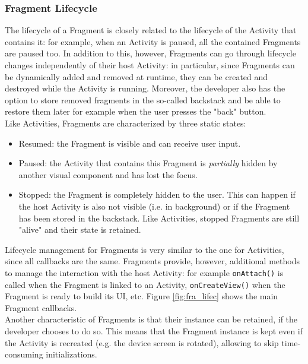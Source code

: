 \documentclass[11pt,a4paper,notitlepage]{article}
\begin{document}
\subsubsection{Fragment Lifecycle}
The lifecycle of a Fragment is closely related to the lifecycle of the Activity that contains it: for example, when an Activity is paused, all the contained Fragments are paused too. In addition to this, however, Fragments can go through lifecycle changes independently of their host Activity: in particular, since Fragments can be dynamically added and removed at runtime, they can be created and destroyed while the Activity is running. Moreover, the developer also has the option to store removed fragments in the so-called backstack and be able to restore them later for example when the user presses the "back" button.\medskip \\
Like Activities, Fragments are characterized by three static states:
\begin{itemize}
	\item Resumed: the Fragment is visible and can receive user input.
	\item Paused: the Activity that contains this Fragment is \textit{partially} hidden by another visual component and has lost the focus.
	\item Stopped: the Fragment is completely hidden to the user. This can happen if the host Activity is also not visible (i.e. in background) or if the Fragment has been stored in the backstack. Like Activities, stopped Fragments are still "alive" and their state is retained.
\end{itemize}
Lifecycle management for Fragments is very similar to the one for Activities, since all callbacks are the same. Fragments provide, however, additional methods to manage the interaction with the host Activity: for example \texttt{onAttach()} is called when the Fragment is linked to an Activity, \texttt{onCreateView()} when the Fragment is ready to build its UI, etc. Figure \ref{fig:fra_lifec} shows the main Fragment callbacks.\bigskip \\
Another characteristic of Fragments is that their instance can be retained, if the developer chooses to do so. This means that the Fragment instance is kept even if the Activity is recreated (e.g. the device screen is rotated), allowing to skip time-consuming initializations.
\end{document}
